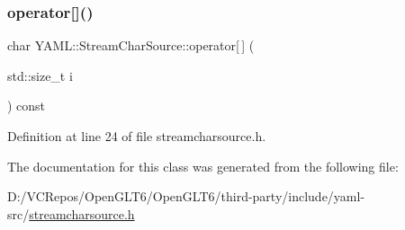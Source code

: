 \subsubsection{\texorpdfstring{operator[]()}{operator[]()}}
{\footnotesize\ttfamily char Y\+A\+M\+L\+::\+Stream\+Char\+Source\+::operator\mbox{[}$\,$\mbox{]} (\begin{DoxyParamCaption}\item[{std\+::size\+\_\+t}]{i }\end{DoxyParamCaption}) const\hspace{0.3cm}{\ttfamily [inline]}}



Definition at line 24 of file streamcharsource.\+h.



The documentation for this class was generated from the following file\+:\begin{DoxyCompactItemize}
\item 
D\+:/\+V\+C\+Repos/\+Open\+G\+L\+T6/\+Open\+G\+L\+T6/third-\/party/include/yaml-\/src/\mbox{\hyperlink{streamcharsource_8h}{streamcharsource.\+h}}\end{DoxyCompactItemize}
